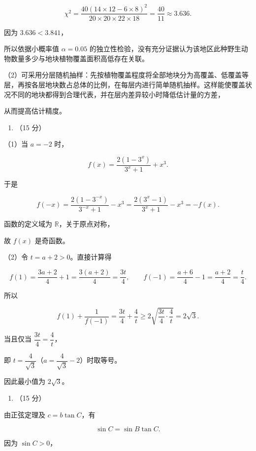 \documentclass[UTF8,12pt,a4paper]{ctexart}
\renewcommand{\labelenumi}{\arabic{enumi}.}
\providecommand{\tightlist}{%
  \setlength{\itemsep}{0pt}\setlength{\parskip}{0pt}}
\begin{document}
\[
   \chi^2=\dfrac{40(14\times12-6\times8)^2}{20\times20\times22\times18}
   =\dfrac{40}{11}\approx3.636.
   \]

因为 \(3.636<3.841\)，

所以依据小概率值 \(\alpha=0.05\) 的独立性检验，没有充分证据认为该地区此种野生动物数量多少与地块植物覆盖面积高低存在关联。

（2）可采用分层随机抽样：先按植物覆盖程度将全部地块分为高覆盖、低覆盖等层，再按各层地块数占总体的比例，在每层内进行简单随机抽样。这样能使覆盖状况不同的地块都得到合理代表，并在层内差异较小时降低估计量的方差，

从而提高估计精度。

\begin{enumerate}
\def\labelenumi{\arabic{enumi}.}
\setcounter{enumi}{15}
\tightlist
\item
  （15 分）
\end{enumerate}

（1）当 \(a=-2\) 时，

\[
   f(x)=\dfrac{2(1-3^x)}{3^x+1}+x^3.
   \]

于是

\[
   f(-x)=\dfrac{2(1-3^{-x})}{3^{-x}+1}-x^3
   =\dfrac{2(3^x-1)}{3^x+1}-x^3=-f(x).
   \]

函数的定义域为 \(\mathbb R\)，关于原点对称，

故 \(f(x)\) 是奇函数。

（2）令 \(t=a+2>0\)。直接计算得

\[
   f(1)=\dfrac{3a+2}{4}+1=\dfrac{3(a+2)}4=\dfrac{3t}{4},
   \qquad
   f(-1)=\dfrac{a+6}{4}-1=\dfrac{a+2}{4}=\frac t4.
   \]

所以

\[
   f(1)+\frac1{f(-1)}=\dfrac{3t}{4}+\frac4t
   \ge 2\sqrt{\dfrac{3t}{4}\cdot\frac4t}=2\sqrt3.
   \]

当且仅当 \(\dfrac{3t}{4}=\dfrac4t\)，

即 \(t=\dfrac4{\sqrt3}\)（\(a=\dfrac4{\sqrt3}-2\)）时取等号。

因此最小值为 \(2\sqrt3\)。

\begin{enumerate}
\def\labelenumi{\arabic{enumi}.}
\setcounter{enumi}{16}
\tightlist
\item
  （15 分）
\end{enumerate}

由正弦定理及 \(c=b\tan C\)，有

\[
   \sin C=\sin B\tan C.
   \]

因为 \(\sin C>0\)，
\end{document}
